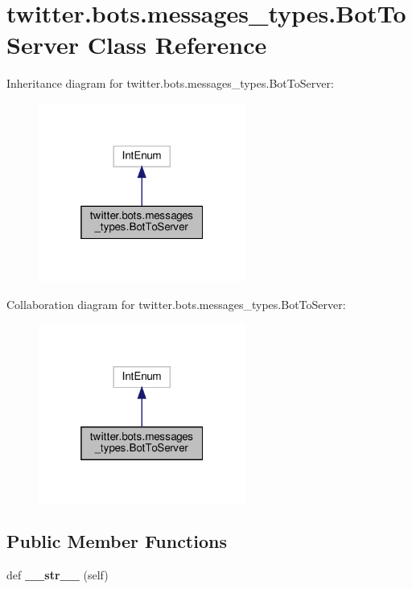 \hypertarget{classtwitter_1_1bots_1_1messages__types_1_1BotToServer}{}\section{twitter.\+bots.\+messages\+\_\+types.\+Bot\+To\+Server Class Reference}
\label{classtwitter_1_1bots_1_1messages__types_1_1BotToServer}


Inheritance diagram for twitter.\+bots.\+messages\+\_\+types.\+Bot\+To\+Server\+:
\nopagebreak
\begin{figure}[H]
\begin{center}
\leavevmode
\includegraphics[width=193pt]{classtwitter_1_1bots_1_1messages__types_1_1BotToServer__inherit__graph}
\end{center}
\end{figure}


Collaboration diagram for twitter.\+bots.\+messages\+\_\+types.\+Bot\+To\+Server\+:
\nopagebreak
\begin{figure}[H]
\begin{center}
\leavevmode
\includegraphics[width=193pt]{classtwitter_1_1bots_1_1messages__types_1_1BotToServer__coll__graph}
\end{center}
\end{figure}
\subsection*{Public Member Functions}
\begin{DoxyCompactItemize}
\item 
\mbox{\label{classtwitter_1_1bots_1_1messages__types_1_1BotToServer_a915f4adbd233145618c2deec2c13e4eb}} 
def {\bfseries \+\_\+\+\_\+str\+\_\+\+\_\+} (self)
\end{DoxyCompactItemize}
